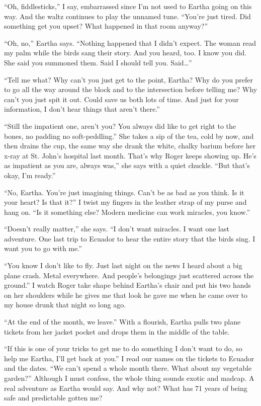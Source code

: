 \documentclass[twoside,10pt]{book}
\begin{document}
``Oh, fiddlesticks,'' I say, embarrassed since I'm not used to Eartha
going on this way. And the waltz continues to play the unnamed tune.
``You're just tired. Did something get you upset? What happened in that
room anyway?''

``Oh, no,'' Eartha says. ``Nothing happened that I didn't expect. The
woman read my palm while the birds sang their story. And you heard, too.
I know you did. She said you summoned them. Said I should tell you.
Said\ldots''

``Tell me what? Why can't you just get to the point, Eartha? Why do you
prefer to go all the way around the block and to the intersection before
telling me? Why can't you just spit it out. Could save us both lots of
time. And just for your information, I don't hear things that aren't
there.''

``Still the impatient one, aren't you? You always did like to get right
to the bones, no padding no soft-peddling.'' She takes a sip of the tea,
cold by now, and then drains the cup, the same way she drank the white,
chalky barium before her x-ray at St. John's hospital last month. That's
why Roger keeps showing up. He's as impatient as you are, always was,''
she says with a quiet chuckle. ``But that's okay, I'm ready.''

``No, Eartha. You're just imagining things. Can't be as bad as you
think. Is it your heart? Is that it?'' I twist my fingers in the leather
strap of my purse and hang on. ``Is it something else? Modern medicine
can work miracles, you know.''

``Doesn't really matter,'' she says. ``I don't want miracles. I want one
last adventure. One last trip to Ecuador to hear the entire story that
the birds sing. I want you to go with me.''

``You know I don't like to fly. Just last night on the news I heard
about a big plane crash. Metal everywhere. And people's belongings just
scattered across the ground.'' I watch Roger take shape behind Eartha's
chair and put his two hands on her shoulders while he gives me that look
he gave me when he came over to my house drunk that night so long ago.

``At the end of the month, we leave.'' With a flourish, Eartha pulls two
plane tickets from her jacket pocket and drops them in the middle of the
table.

``If this is one of your tricks to get me to do something I don't want
to do, so help me Eartha, I'll get back at you.'' I read our names on
the tickets to Ecuador and the dates. ``We can't spend a whole month
there. What about my vegetable garden?'' Although I must confess, the
whole thing sounds exotic and madcap. A real adventure as Eartha would
say. And why not? What has 71 years of being safe and predictable gotten
me?
\end{document}
